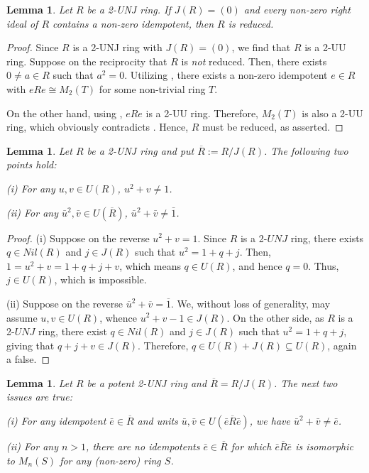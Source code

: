\documentclass[12pt]{amsart}
\newtheorem{lemma}[theorem]{Lemma}
\theoremstyle{definition}
\begin{document}
\begin{lemma}\label{3.12}
Let \(R\) be a 2-UNJ ring. If \(J(R) = (0)\) and every non-zero right ideal of \(R\) contains a non-zero idempotent, then \(R\) is reduced.
\end{lemma}

\begin{proof}
Since $R$ is a 2-UNJ ring with $J(R) = (0)$, we find that $R$ is a 2-UU ring. Suppose on the reciprocity that $R$ is {\it not} reduced. Then, there exists $0 \neq a \in R$ such that $a^2 = 0$. Utilizing \cite[Theorem 2.1]{3}, there exists a non-zero idempotent $e \in R$ with $eRe \cong M_2(T)$ for some non-trivial ring $T$.

On the other hand, using \cite[Corollary 2.23]{djm}, $eRe$ is a 2-UU ring. Therefore, $M_2(T)$ is also a 2-UU ring, which obviously contradicts \cite[Example 2.1]{10}. Hence, $R$ must be reduced, as asserted.
\end{proof}

\begin{lemma} \label{sum two unit}
Let $R$ be a 2-UNJ ring and put $\overline{R} := R/J(R)$. The following two points hold:
	
(i) For any $u, v \in U(R)$, $u^2 + v \neq 1$.
	
(ii) For any $\bar{u}^2, \bar{v} \in U(\overline{R})$, $\bar{u}^2 + \bar{v} \neq \bar{1}$.
\end{lemma}

\begin{proof}
(i) Suppose on the reverse $u^2 + v = 1$. Since $R$ is a 2-$UNJ$ ring, there exists $q \in Nil(R)$ and $j\in J(R)$ such that $u^2 = 1 + q+j$. Then, $1 = u^2 + v = 1 + q +j+ v$, which means $q\in U(R)$, and hence $q=0$. Thus, $j\in U(R)$, which is impossible.
	
(ii) Suppose on the reverse $\overline{u}^2 + \overline{v} = \overline{1}$. We, without loss of generality, may assume $u, v \in U(R)$, whence $u^2 + v - 1 \in J(R)$. On the other side, as $R$ is a 2-$UNJ$ ring, there exist $q \in Nil(R)$ and $j\in J(R)$ such that $u^2 = 1 + q+j$, giving that $q +j+ v \in J(R)$. Therefore, $q \in U(R) + J(R) \subseteq U(R)$, again a false.
\end{proof}

\begin{lemma}\label{exe}
Let $R$ be a potent 2-UNJ ring and $\overline{R} = R/J(R)$. The next two issues are true:
	
(i) For any idempotent $\bar{e} \in \overline{R}$ and units $\bar{u}, \bar{v} \in U(\bar{e}\overline{R}\bar{e})$, we have $\bar{u}^2 + \bar{v} \neq \bar{e}$.
	
(ii) For any $n>1$, there are no idempotents $\bar{e} \in \overline{R}$ for which $\bar{e}\overline{R}\bar{e}$ is isomorphic to $M_n(S)$ for any (non-zero) ring $S$.
\end{lemma}
\end{document}
